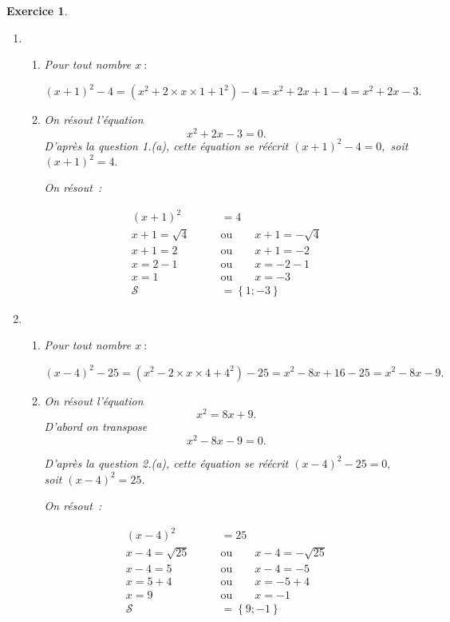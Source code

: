 \documentclass[10pt]{article}
\newtheorem{exo}{Exercice}
\begin{document}
\begin{exo}

\begin{enumerate}
\item 
\begin{enumerate}
\item Pour tout nombre $x~:$

\[(x+1)^2-4=\left(x^2+2\times x\times 1+1^2\right)-4=x^2+2x+1-4=x^2+2x-3.\]
\item On résout l'équation \[x^2+2x-3=0.\] D'après la question 1.(a), cette équation se réécrit $(x+1)^2-4=0,$ soit $(x+1)^2=4.$

On résout~:

\begin{align*}(x+1)^2&=4\\
x+1=\sqrt{4} \qquad &\text{ou}\qquad x+1=-\sqrt{4}\\
x+1=2 \qquad &\text{ou}\qquad x+1=-2\\
x=2-1 \qquad &\text{ou}\qquad x=-2-1\\
x=1  \qquad &\text{ou}\qquad x=-3\\
\mathcal{S}&=\left\{1;-3\right\}
\end{align*}

\end{enumerate}
\item \begin{enumerate}
\item Pour tout nombre $x~:$

\[(x-4)^2-25=\left(x^2-2\times x\times 4+4^2\right)-25=x^2-8x+16-25=x^2-8x-9.\]
\item On résout l'équation \[x^2=8x+9.\] D'abord on transpose \[x^2-8x-9=0.\]

D'après la question 2.(a), cette équation se réécrit $(x-4)^2-25=0,$ soit $(x-4)^2=25.$

On résout~:

\begin{align*}(x-4)^2&=25\\
x-4=\sqrt{25} \qquad &\text{ou}\qquad x-4=-\sqrt{25}\\
x-4=5 \qquad &\text{ou}\qquad x-4=-5\\
x=5+4 \qquad &\text{ou}\qquad x=-5+4\\
x=9  \qquad &\text{ou}\qquad x=-1\\
\mathcal{S}&=\left\{9;-1\right\}
\end{align*}

\end{enumerate}



\end{enumerate}
\end{exo}
\end{document}
